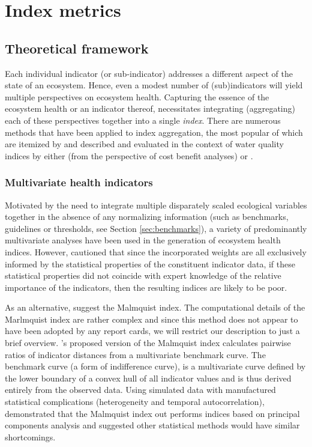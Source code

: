 \section{Index metrics}\label{sec:indexing}

\subsection{Theoretical framework}
 
Each individual indicator (or sub-indicator) addresses a different aspect of the state of an
ecosystem.  Hence, even a modest number of (sub)indicators will yield multiple perspectives on
ecosystem health.  Capturing the essence of the ecosystem health or an indicator thereof,
necessitates integrating (aggregating) each of these perspectives together into a single
\textit{index}.  There are numerous methods that have been applied to index aggregation, the most
popular of which are itemized by \citet{Fox-2013-2013} and described and evaluated in the context of
water quality indices by either \citet{Walsh-2012} (from the perspective of cost benefit analyses)
or \citet{Whittaker-2012}.

\subsubsection{Multivariate health indicators}

Motivated by the need to integrate multiple disparately scaled ecological variables together in the
absence of any normalizing information (such as benchmarks, guidelines or thresholds, see Section
\ref{sec:benchmarks}), a variety of predominantly multivariate analyses have been used in the
generation of ecosystem health indices.  However, \citet{Whittaker-2012} cautioned that since the
incorporated weights are all exclusively informed by the statistical properties of the constituent
indicator data, if these statistical properties did not coincide with expert knowledge of the
relative importance of the indicators, then the resulting indices are likely to be poor.

As an alternative, \citet{Whittaker-2012} suggest the Malmquist index.  The computational details of
the Marlmquist index are rather complex and since this method does not appear to have been adopted
by any report cards, we will restrict our description to just a brief overview.
\citet{Whittaker-2012}'s proposed version of the Malmquist index calculates pairwise ratios of
indicator distances from a multivariate benchmark curve.  The benchmark curve (a form of
indifference curve), is a multivariate curve defined by the lower boundary of a convex hull of all
indicator values and is thus derived entirely from the observed data.  Using simulated data with
manufactured statistical complications (heterogeneity and temporal autocorrelation),
\citet{Whittaker-2012} demonstrated that the Malmquist index out performs indices based on principal
components analysis and suggested other statistical methods would have similar shortcomings.

